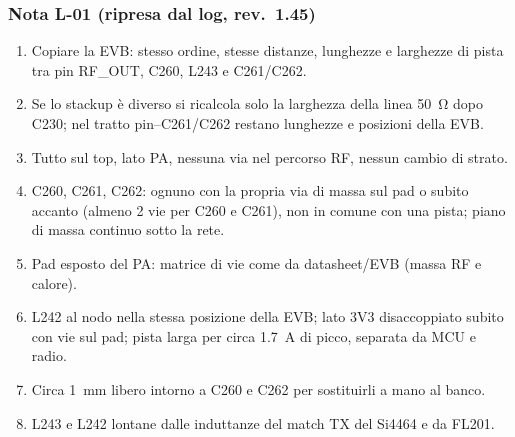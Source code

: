 \documentclass[a4paper,10pt]{article}
\newcommand{\net}[1]{\texttt{\detokenize{#1}}}
\begin{document}
\subsubsection{Nota L-01 (ripresa dal log, rev.~1.45)}
\begin{tcolorbox}[enhanced,breakable,colback=txred!4,colframe=txred,boxrule=1pt,arc=1.5pt,
  title={\sffamily\bfseries Nota di layout L-01 \textendash{} rete d'uscita del QPA9510},fonttitle=\small,
  coltitle=white,colbacktitle=txred,left=6pt,right=6pt,top=4pt,bottom=4pt]
\small
\begin{enumerate}
\item Copiare la EVB: stesso ordine, stesse distanze, lunghezze e larghezze di pista tra pin RF\_OUT,
      C260, L243 e C261/C262.
\item Se lo stackup è diverso si ricalcola solo la larghezza della linea \SI{50}{\ohm} dopo C230; nel tratto
      pin--C261/C262 restano lunghezze e posizioni della EVB.
\item Tutto sul top, lato PA, nessuna via nel percorso RF, nessun cambio di strato.
\item C260, C261, C262: ognuno con la propria via di massa sul pad o subito accanto (almeno 2 vie per C260
      e C261), non in comune con una pista; piano di massa continuo sotto la rete.
\item Pad esposto del PA: matrice di vie come da datasheet/EVB (massa RF e calore).
\item L242 al nodo \net{RF_PA_OUT} nella stessa posizione della EVB; lato 3V3 disaccoppiato subito con vie sul
      pad; pista larga per circa \SI{1.7}{A} di picco, separata da MCU e radio.
\item Circa \SI{1}{mm} libero intorno a C260 e C262 per sostituirli a mano al banco.
\item L243 e L242 lontane dalle induttanze del match TX del Si4464 e da FL201.
\end{enumerate}
\end{tcolorbox}
\end{document}

